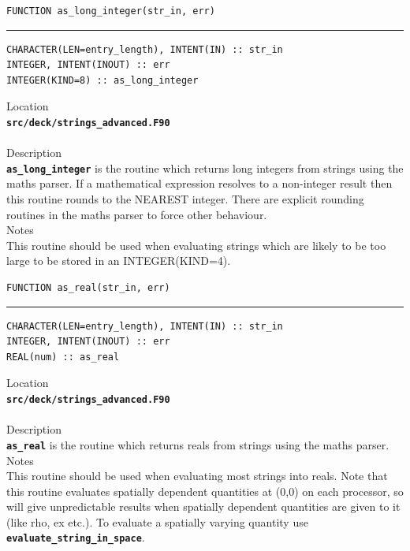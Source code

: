 \documentclass[12pt,a4paper]{article}
\newcommand{\HRule}{\rule{\linewidth}{0.5mm}}
\newcommand{\inlinecode}[1]{{\color{warwickred} \bf\texttt{#1}}}
\newcommand{\codedef}{\begin{Verbatim}[formatcom=\color{warwickred},fontsize=\Large,hfuzz=0pt]}
\newcommand{\coderule}{
{\color{warwickred}\vspace{-0.5cm}\HRule}
\codedef}
\begin{document}
\pagebreak
\codedef
FUNCTION as_long_integer(str_in, err)
\end{Verbatim}
\coderule
CHARACTER(LEN=entry_length), INTENT(IN) :: str_in
INTEGER, INTENT(INOUT) :: err
INTEGER(KIND=8) :: as_long_integer
\end{Verbatim}
\vspace{1cm}
{\Large Location\\}
\inlinecode{src/deck/strings\_advanced.F90}\\
\\[0.5cm]
{\Large Description\\}
\inlinecode{as\_long\_integer} is the routine which returns long integers from
strings using the maths parser. If a mathematical expression resolves to a
non-integer result then this routine rounds to the NEAREST integer. There are
explicit rounding routines in the maths parser to force other behaviour.
\\[0.5cm]
{\Large Notes\\}
This routine should be used when evaluating strings which are likely to be too
large to be stored in an INTEGER(KIND=4).

\pagebreak
\codedef
FUNCTION as_real(str_in, err)
\end{Verbatim}
\coderule
CHARACTER(LEN=entry_length), INTENT(IN) :: str_in
INTEGER, INTENT(INOUT) :: err
REAL(num) :: as_real
\end{Verbatim}
\vspace{1cm}
{\Large Location\\}
\inlinecode{src/deck/strings\_advanced.F90}\\
\\[0.5cm]
{\Large Description\\}
\inlinecode{as\_real} is the routine which returns reals from strings using the
maths parser.
\\[0.5cm]
{\Large Notes\\}
This routine should be used when evaluating most strings into reals. Note that
this routine evaluates spatially dependent quantities at (0,0) on each
processor, so will give unpredictable results when spatially dependent
quantities are given to it (like rho, ex etc.). To evaluate a spatially varying
quantity use \inlinecode{evaluate\_string\_in\_space}.
\end{document}
